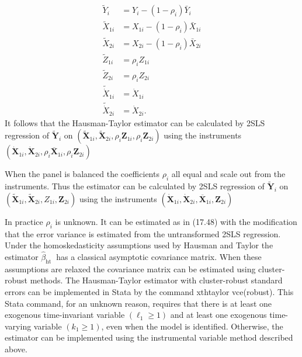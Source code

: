\documentclass[10pt]{article}
\begin{document}
$$
\begin{aligned}
\widetilde{Y}_{i} &=Y_{i}-\left(1-\rho_{i}\right) \bar{Y}_{i} \\
\widetilde{X}_{1 i} &=X_{1 i}-\left(1-\rho_{i}\right) \bar{X}_{1 i} \\
\widetilde{X}_{2 i} &=X_{2 i}-\left(1-\rho_{i}\right) \bar{X}_{2 i} \\
\widetilde{Z}_{1 i} &=\rho_{i} Z_{1 i} \\
\widetilde{Z}_{2 i} &=\rho_{i} Z_{2 i} \\
\widetilde{\dot{X}}_{1 i} &=\dot{X}_{1 i} \\
\widetilde{\dot{X}}_{2 i} &=\dot{X}_{2 i} .
\end{aligned}
$$
It follows that the Hausman-Taylor estimator can be calculated by 2SLS regression of $\widetilde{\boldsymbol{Y}}_{i}$ on $\left(\widetilde{\boldsymbol{X}}_{1 i}, \widetilde{\boldsymbol{X}}_{2 i}, \rho_{i} \boldsymbol{Z}_{1 i}, \rho_{i} \boldsymbol{Z}_{2 i}\right)$ using the instruments $\left(\dot{\boldsymbol{X}}_{1 i}, \dot{\boldsymbol{X}}_{2 i}, \rho_{i} \overline{\boldsymbol{X}}_{1 i}, \rho_{i} \boldsymbol{Z}_{2 i}\right)$

When the panel is balanced the coefficients $\rho_{i}$ all equal and scale out from the instruments. Thus the estimator can be calculated by 2SLS regression of $\widetilde{\boldsymbol{Y}}_{i}$ on $\left(\widetilde{\boldsymbol{X}}_{1 i}, \widetilde{\boldsymbol{X}}_{2 i}, Z_{1 i}, \boldsymbol{Z}_{2 i}\right)$ using the instruments $\left(\dot{\boldsymbol{X}}_{1 i}, \dot{\boldsymbol{X}}_{2 i}, \overline{\boldsymbol{X}}_{1 i}, \boldsymbol{Z}_{2 i}\right)$

In practice $\rho_{i}$ is unknown. It can be estimated as in (17.48) with the modification that the error variance is estimated from the untransformed 2SLS regression. Under the homoskedasticity assumptions used by Hausman and Taylor the estimator $\widehat{\beta}_{\text {ht }}$ has a classical asymptotic covariance matrix. When these assumptions are relaxed the covariance matrix can be estimated using cluster-robust methods. The Hausman-Taylor estimator with cluster-robust standard errors can be implemented in Stata by the command xthtaylor vce(robust). This Stata command, for an unknown reason, requires that there is at least one exogenous time-invariant variable $\left(\ell_{1} \geq 1\right)$ and at least one exogenous time-varying variable $\left(k_{1} \geq 1\right)$, even when the model is identified. Otherwise, the estimator can be implemented using the instrumental variable method described above.
\end{document}

